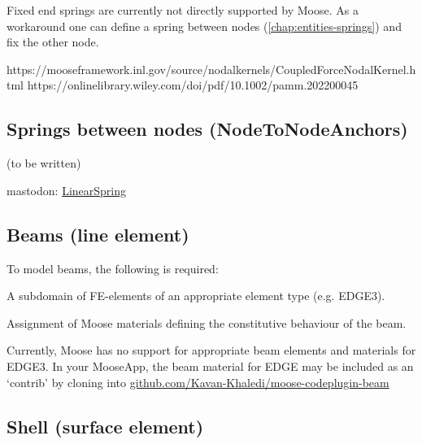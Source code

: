 Fixed end springs are currently not directly supported by Moose. As a
workaround one can define a spring between nodes
(\autoref{chap:entities-springs}) and fix the other node.

https://mooseframework.inl.gov/source/nodalkernels/CoupledForceNodalKernel.html
https://onlinelibrary.wiley.com/doi/pdf/10.1002/pamm.202200045

\subsection{Springs between nodes (NodeToNodeAnchors)}
\label{chap:entities-springs}

(to be written)

mastodon:
\href{https://mooseframework.inl.gov/mastodon/source/materials/LinearSpring.html}{LinearSpring}

\subsection{Beams (line element)}
\label{chap:entities-beams}

To model beams, the following is required:

\begin{description}[font=$\bullet$~\normalfont]
    \item [subdomain:] A subdomain of FE-elements of an appropriate element type (e.g. EDGE3).
    \item [materials:] Assignment of Moose materials defining the constitutive behaviour of the beam.
\end{description}

Currently, Moose has no support for appropriate beam elements and materials for EDGE3. In your MooseApp, the beam material for EDGE may be included as an ‘contrib’ by cloning into
\href{https://github.com/Kavan-Khaledi/moose-codeplugin-beam}{github.com/Kavan-Khaledi/moose-codeplugin-beam}


\subsection{Shell (surface element)}
\label{chap:entities-shell}

